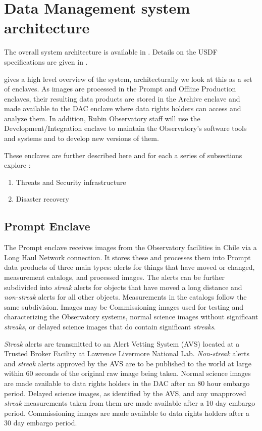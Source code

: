 

\section{Data Management system architecture} \label{sec:dparc}
The overall system architecture is available in .
Details on the \gls{USDF} specifications are given in .

 gives a high level overview of the system, architecturally we look
at this as a set of enclaves.
As images are processed in the Prompt and Offline Production enclaves, their resulting data products are stored in the \gls{Archive} enclave and made available to the DAC enclave where data rights holders can access and analyze them.
In addition, Rubin Observatory staff will use the Development/Integration enclave to maintain the Observatory's software tools and systems and to develop new versions of them.

These enclaves are further described here and for each a series of subsections explore :


\begin{enumerate}
\item Threats and Security infrastructure
\item Disaster recovery
\end{enumerate}

\subsection{Prompt \gls{Enclave}}

The Prompt enclave receives images from the Observatory facilities in Chile via a Long Haul Network connection.
It stores these and processes them into Prompt data products of three main types:
alerts for things that have moved or changed, measurement catalogs, and processed images.
The alerts can be further subdivided into \emph{streak} alerts for objects that have moved a long distance and \emph{non-streak} alerts for all other objects.
Measurements in the catalogs follow the same subdivision. Images may be \gls{Commissioning} images used for testing and characterizing the Observatory systems, normal science images without significant \emph{streaks}, or delayed science images that do contain significant \emph{streaks}.

\emph{Streak} alerts are transmitted to an \gls{Alert} Vetting System (AVS) located at a Trusted Broker Facility at  Lawrence Livermore National Lab.
\emph{Non-streak} alerts and \emph{streak} alerts approved by the \gls{AVS} are to be published to the world at large within 60 seconds of the original raw image being taken.
Normal science images are made available to data rights holders in the \gls{DAC} after an 80 hour embargo period.
Delayed science images, as identified by the \gls{AVS}, and any unapproved \emph{streak} measurements taken from them are made available after a 10 day embargo period. Commissioning images are made available to data rights holders after a 30 day embargo period.

